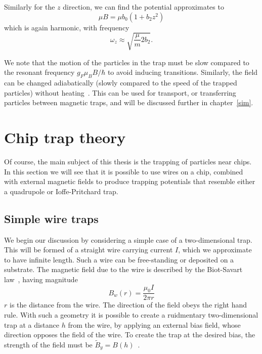Similarly for the $z$ direction, we can find the potential
approximates to
%
\begin{equation}
  \mu B = \mu b_0 (1 + b_2 z^2)
\end{equation}
%
which is again harmonic, with frequency
%
\begin{equation}
  \omega_z \approx \sqrt{\frac{\mu}{m}2b_2}.
\end{equation}

We note that the motion of the particles in the trap must be slow compared to
the resonant frequency $g_F\mu_BB/\hbar$ to avoid inducing transitions.
Similarly, the field can be changed adiabatically (slowly compared to the speed
of the trapped particles) without heating~\cite{}. This can be used for
transport, or transferring particles between magnetic traps, and will be
discussed further in chapter~\ref{sim}.

\section{Chip trap theory}
\label{theory:chips}

Of course, the main subject of this thesis is the trapping of particles near
chips. In this section we will see that it is possible to use wires on a chip,
combined with external magnetic fields to produce trapping potentials that
resemble either a quadrupole or Ioffe-Pritchard trap.

\subsection{Simple wire traps}

We begin our discussion by considering a simple case of a two-dimensional trap.
This will be formed of a straight wire carrying current $I$, which we
approximate to have infinite length. Such a wire can be free-standing or
deposited on a substrate. The magnetic field due to the wire is described by
the Biot-Savart law~\cite{}, having magnitude
%
\begin{equation}
  B_w(r) = \frac{\mu_0 I}{2 \pi r}
\end{equation}
%
$r$ is the distance from the wire. The direction of the field obeys the right
hand rule. With such a geometry it is possible to create a ruidmentary
two-dimensional trap at a distance $h$ from the wire, by applying an external
bias field, whose direction opposes the field of the wire. To create the trap
at the desired bias, the strength of the field must be $\tilde{B}_y =
B(h)$~\cite{2011Ac}.

